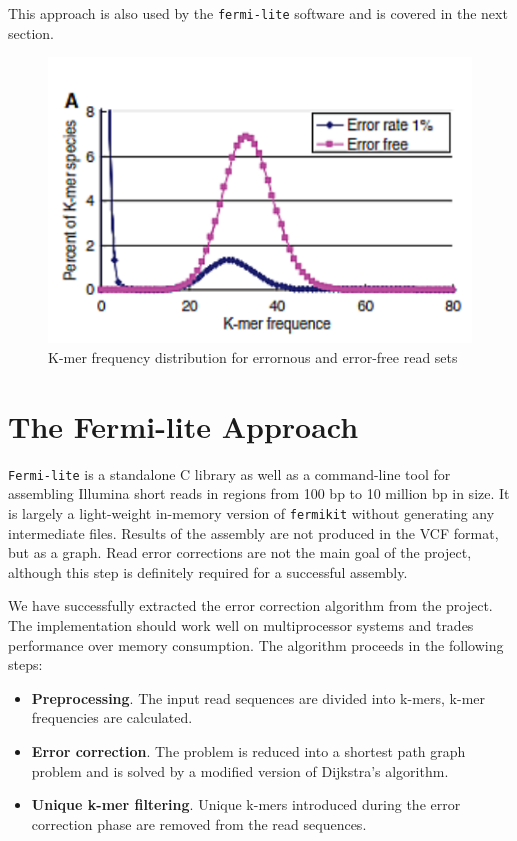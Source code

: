 This approach is also used by the \texttt{fermi-lite}\cite{fermi-lite} software and is covered in the next section.

\begin{figure}[h]
	\centering
	\includegraphics{img/kmer-frequency-distribution.pdf}
	\caption{K-mer frequency distribution for errornous and error-free read sets}
	\label{fig:kmer-frequency-distribution}
\end{figure}

\section{The Fermi-lite Approach}
\label{sec:fermi-lite}

\texttt{Fermi-lite} is a standalone C library as well as a command-line tool for assembling Illumina short reads in regions from 100 bp to 10 million bp in size. It is largely a light-weight in-memory version of \texttt{fermikit}\cite{fermikit} without generating any intermediate files\cite{fermi-lite}. Results of the assembly are not produced in the VCF format, but as a graph. Read error corrections are not the main goal of the project, although this step is definitely required for a successful assembly.

We have successfully extracted the error correction algorithm from the project. The implementation should work well on multiprocessor systems and trades performance over memory consumption. The algorithm proceeds in the following steps:
\begin{itemize}
\item \textbf{Preprocessing}. The input read sequences are divided into k-mers, k-mer frequencies are calculated.
\item \textbf{Error correction}. The problem is reduced into a shortest path graph problem and is solved by a modified version of Dijkstra's algorithm.
\item \textbf{Unique k-mer filtering}. Unique k-mers introduced during the error correction phase are removed from the read sequences.
\end{itemize}
 
